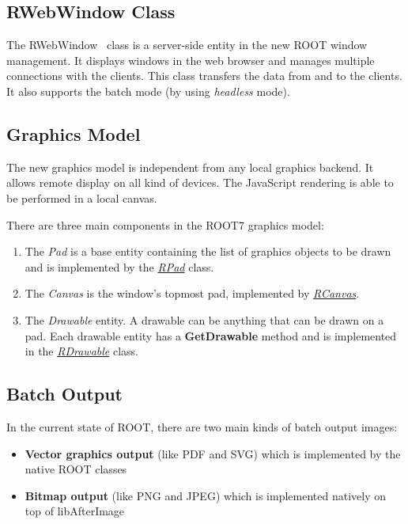 \documentclass[a4paper]{jpconf}
\begin{document}
\subsection{RWebWindow Class}
The RWebWindow~\cite{rweb} class is a server-side entity in the new ROOT window management.
It displays windows in the web browser and manages multiple connections with the clients.
This class transfers the data from and to the clients. It also supports the batch
mode (by using \textit{headless} mode).

 \subsection{Graphics Model}
 The new graphics model is independent from any local graphics backend. It allows
 remote display on all kind of devices. The JavaScript rendering is able to be
 performed in a local canvas.

There are three main components in the ROOT7 graphics model:
\begin{enumerate}[label=\alph*)]
  \item The \textit{Pad} is a base entity containing the list of graphics objects to be drawn and is implemented by the \textit{\href{https://root.cern/doc/master/classROOT_1_1Experimental_1_1RPad.html}{RPad}} class.
  \item The \textit{Canvas} is the window's topmost pad, implemented by \textit{\href{https://root.cern/doc/master/classROOT_1_1Experimental_1_1RCanvas.html}{RCanvas}}.
  \item The \textit{Drawable} entity. A drawable can be anything that can be drawn on a pad. Each drawable entity has a \textbf{GetDrawable} method and is implemented in the \textit{\href{https://root.cern/doc/master/classROOT_1_1Experimental_1_1RDrawable.html}{RDrawable}} class.
\end{enumerate}

\subsection{Batch Output}

In the current state of ROOT, there are two main kinds of batch output images:
\begin{itemize}
  \item \textbf{Vector graphics output} (like PDF and SVG) which is implemented by the native ROOT classes
  \item \textbf{Bitmap output} (like PNG and JPEG) which is implemented natively on top of libAfterImage
\end{itemize}
\end{document}
